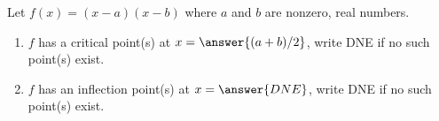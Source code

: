 \documentclass{ximera}
\author{Gregory Hartman \and Matthew Carr}
\begin{document}
\begin{exercise}



Let $f(x)=(x-a)(x-b)$  where $a$ and $b$ are nonzero, real numbers. 
\begin{enumerate}
\item		$f$ has a critical point(s) at $x = \answer{(a+b)/2}$, write DNE if no such point(s) exist.
\item		$f$ has an inflection point(s) at $x = \answer{DNE}$, write DNE if no such point(s) exist.

\end{enumerate}

\end{exercise}
\end{document}

